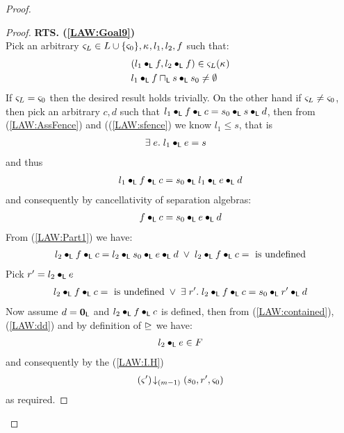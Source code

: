 \begin{lemma}[]
\begin{proof}
\begin{proof}
\noindent\textbf{RTS. (\ref{LAW:Goal9})}\\
Pick an arbitrary $\varsigma_{L} \in L \cup \{\varsigma_{0}\}, \kappa_{}, l_1, l_2, f$ such that:
%
\begin{align}
	& (l_1 \bullet_{\textsf{L}} f, l_2 \bullet_{\textsf{L}} f) \in \varsigma_{L}(\kappa_{}) \label{LAW:Ass16}\\
	& l_1 \bullet_{\textsf{L}} f \sqcap_{\textsf{L}} s \bullet_{\textsf{L}} s_0 \not= \emptyset \label{LAW:Ass17}\\
\end{align}
%
If $\varsigma_{L} = \varsigma_{0}$ then the desired result holds trivially. On the other hand if $\varsigma_{L} \not= \varsigma_{0}$, then pick an arbitrary $c, d$ such that $l_1 \bullet_{\textsf{L}} f \bullet_{\textsf{L}} c = s_0 \bullet_{\textsf{L}} s \bullet_{\textsf{L}} d$, then from (\ref{LAW:AssFence}) and ((\ref{LAW:sfence}) we know $l_1 \leq s$, that is 
%
\begin{align}
	& \exists\; e.\; l_1 \bullet_{\textsf{L}} e = s \label{LAW:contained}
\end{align}
%
and thus
%
\begin{align}
	l_1 \bullet_{\textsf{L}} f \bullet_{\textsf{L}} c = s_0 \bullet_{\textsf{L}} l_1 \bullet_{\textsf{L}} e \bullet_{\textsf{L}} d \nonumber
\end{align}
%
and consequently by cancellativity of separation algebras:
%
\begin{align}
	f \bullet_{\textsf{L}} c = s_0 \bullet_{\textsf{L}} e \bullet_{\textsf{L}} d \label{LAW:Part1}
\end{align}
%
From (\ref{LAW:Part1}) we have:
%
\begin{align}
	l_2 \bullet_{\textsf{L}} f \bullet_{\textsf{L}} c = l_2 \bullet_{\textsf{L}} s_0 \bullet_{\textsf{L}} e \bullet_{\textsf{L}} d \;\lor\; l_2 \bullet_{\textsf{L}} f \bullet_{\textsf{L}} c = \text{ is undefined} \nonumber
\end{align}
%
Pick $r' = l_2 \bullet_{\textsf{L}} e$
%
\begin{align}
	l_2 \bullet_{\textsf{L}} f \bullet_{\textsf{L}} c = \text{ is undefined} \;\lor\; \exists\; r'.\; l_2 \bullet_{\textsf{L}} f \bullet_{\textsf{L}} c = s_0 \bullet_{\textsf{L}} r' \bullet_{\textsf{L}} d \label{LAW:Part2}
\end{align}
%
Now assume $d = \mathbf{0}_{\textsf{L}}$ and $l_2 \bullet_{\textsf{L}} f \bullet_{\textsf{L}} c$ is defined, then from (\ref{LAW:contained}), (\ref{LAW:dd}) and by definition of $\unrhd$ we have:
%
\begin{align}
	l_2 \bullet_{\textsf{L}} e \in F \label{LAW:fenced}
\end{align}
%
and consequently by the (\ref{LAW:I.H})
%
\begin{align}
	\left(\varsigma_{}'\right) \!\downarrow_{(m-1)} \left(s_0, r', \varsigma_{0}\right)
\end{align}
as required.
\renewcommand{\qed}{}
\end{proof}


\end{proof}
\end{lemma}
